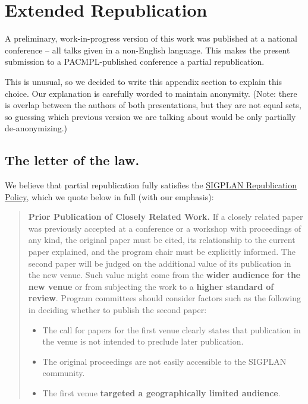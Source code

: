 \section{Extended Republication}
\label{app:extended-republication}

A preliminary, work-in-progress version of this work was published at
a national conference -- all talks given in a non-English
language. This makes the present submission to a PACMPL-published
conference a partial republication.

This is unusual, so we decided to write this appendix section to
explain this choice. Our explanation is carefully worded to maintain
anonymity. (Note: there is overlap between the authors of both
presentations, but they are not equal sets, so guessing which previous
version we are talking about would be only partially de-anonymizing.)

\subsection{The letter of the law.}

We believe that partial republication fully satisfies the
\href{http://www.sigplan.org/Resources/Policies/Republication/}{SIGPLAN
  Republication Policy}, which we quote below in full
(with our emphasis):

\begin{quote}
  \textbf{Prior Publication of Closely Related Work.}  If a closely
  related paper was previously accepted at a conference or a workshop
  with proceedings of any kind, the original paper must be cited, its
  relationship to the current paper explained, and the program chair
  must be explicitly informed. The second paper will be judged on the
  additional value of its publication in the new venue. Such value
  might come from the \textbf{wider audience for the new venue} or
  from subjecting the work to a \textbf{higher standard of
    review}. Program committees should consider factors such as the
  following in deciding whether to publish the second paper:
    \begin{itemize}
    \item The call for papers for the first venue clearly states that publication in the venue is not intended to preclude later publication.
    \item The original proceedings are not easily accessible to the SIGPLAN community.
    \item The first venue \textbf{targeted a geographically limited audience}.
    \end{itemize}
\end{quote}

